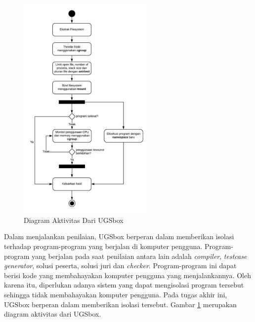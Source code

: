 \begin{figure}[ht!]
    \centering
    \includegraphics[width=0.6\textwidth]{images/sandbox-activity}
    \caption{Diagram Aktivitas Dari UGSbox}
    \label{fig:sandbox-activity}
\end{figure}

\par Dalam menjalankan penilaian, UGSbox berperan dalam memberikan isolasi terhadap program-program yang berjalan di komputer pengguna. Program-program yang berjalan pada saat penilaian antara lain adalah \textit{compiler}, \textit{testcase generator}, solusi peserta, solusi juri dan \textit{checker}. Program-program ini dapat berisi kode yang membahayakan komputer pengguna yang menjalankannya. Oleh karena itu, diperlukan adanya sistem yang dapat mengisolasi program tersebut sehingga tidak membahayakan komputer pengguna. Pada tugas akhir ini, UGSbox berperan dalam memberikan isolasi tersebut. Gambar \ref{fig:sandbox-activity} merupakan diagram aktivitas dari UGSbox.

